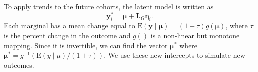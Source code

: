 To apply trends to the future cohorts, the latent model is written as
\[
\mathbf{y}^*_i = \mathbf{\mu} + \mathbf{L}_\Omega \mathbf{\eta}_i.
\]
Each marginal has a mean change equal to $\mathrm{E}(\mathbf{y} \mid \mathbf{\mu}) = (1+\tau)g(\mathbf{\mu})$, where $\tau$ is the 
percent change in the outcome and $g()$ is a non-linear but monotone mapping. Since 
it is invertible, we can find the vector $\mathbf{\mu}^*$ where $\mathbf{\mu}^* = g^{-1}(\mathrm{E}(y \mid \mu)/(1+\tau))$. We use these new intercepts to simulate new outcomes. 
